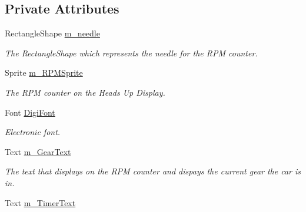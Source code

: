 \subsection*{Private Attributes}
\begin{DoxyCompactItemize}
\item 
\hypertarget{class_h_u_d_a6c7a5b327994d71d475a77747fd4c934}{}Rectangle\+Shape \hyperlink{class_h_u_d_a6c7a5b327994d71d475a77747fd4c934}{m\+\_\+needle}\label{class_h_u_d_a6c7a5b327994d71d475a77747fd4c934}

\begin{DoxyCompactList}\small\item\em The Rectangle\+Shape which represents the needle for the R\+P\+M counter. \end{DoxyCompactList}\item 
\hypertarget{class_h_u_d_a142c3d5c214921762abcd49d0c142eb3}{}Sprite \hyperlink{class_h_u_d_a142c3d5c214921762abcd49d0c142eb3}{m\+\_\+\+R\+P\+M\+Sprite}\label{class_h_u_d_a142c3d5c214921762abcd49d0c142eb3}

\begin{DoxyCompactList}\small\item\em The R\+P\+M counter on the Heads Up Display. \end{DoxyCompactList}\item 
\hypertarget{class_h_u_d_a32e045163732743d7049e2bb011c675a}{}Font \hyperlink{class_h_u_d_a32e045163732743d7049e2bb011c675a}{Digi\+Font}\label{class_h_u_d_a32e045163732743d7049e2bb011c675a}

\begin{DoxyCompactList}\small\item\em Electronic font. \end{DoxyCompactList}\item 
\hypertarget{class_h_u_d_a72021128d2254d91811544cda9fa8ded}{}Text \hyperlink{class_h_u_d_a72021128d2254d91811544cda9fa8ded}{m\+\_\+\+Gear\+Text}\label{class_h_u_d_a72021128d2254d91811544cda9fa8ded}

\begin{DoxyCompactList}\small\item\em The text that displays on the R\+P\+M counter and dispays the current gear the car is in. \end{DoxyCompactList}\item 
\hypertarget{class_h_u_d_abb3f0135e1d280d8c54fcfdbafd9f444}{}Text \hyperlink{class_h_u_d_abb3f0135e1d280d8c54fcfdbafd9f444}{m\+\_\+\+Timer\+Text}\label{class_h_u_d_abb3f0135e1d280d8c54fcfdbafd9f444}


\end{DoxyCompactItemize}
